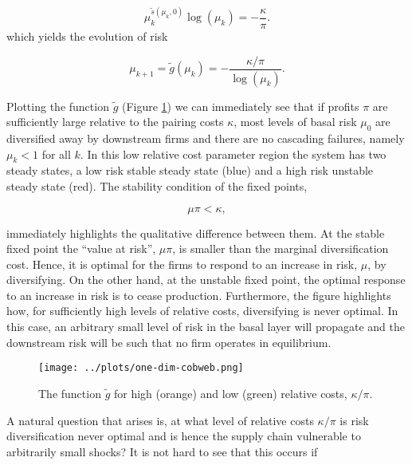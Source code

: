 \documentclass[../../main.tex]{subfiles}
\begin{document}
\begin{equation} \label{eq:one-dimension:foc}
  \mu_k^{\tilde{s}(\mu_k, 0)} \log(\mu_k) = -\frac{\kappa}{\pi}.
\end{equation} which yields the evolution of risk

\begin{equation}
  \mu_{k+1} = \tilde{g}(\mu_k) = -\frac{\kappa / \pi}{\log(\mu_k)}.
\end{equation}

Plotting the function $\tilde{g}$ (Figure \ref{fig:one-dimensional:cobweb}) we can immediately see that if profits $\pi$ are sufficiently large relative to the pairing costs $\kappa$, most levels of basal risk $\mu_0$ are diversified away by downstream firms and there are no cascading failures, namely $\mu_k < 1$ for all $k$. In this low relative cost parameter region the system has two steady states, a low risk stable steady state (blue) and a high risk unstable steady state (red). The stability condition of the fixed points,

\begin{equation}
  \mu \pi < \kappa,
\end{equation}

immediately highlights the qualitative difference between them. At the stable fixed point the ``value at risk'', $\mu \pi$, is smaller than the marginal diversification cost. Hence, it is optimal for the firms to respond to an increase in risk, $\mu$, by diversifying. On the other hand, at the unstable fixed point, the optimal response to an increase in risk is to cease production. Furthermore, the figure highlights how, for sufficiently high levels of relative costs, diversifying is never optimal. In this case, an arbitrary small level of risk in the basal layer will propagate and the downstream risk will be such that no firm operates in equilibrium.

\begin{figure}[H]
  \centering
  \texttt{[image: ../plots/one-dim-cobweb.png]}
  \caption{The function $\tilde{g}$ for high (orange) and low (green) relative costs, $\kappa / \pi$.}
  \label{fig:one-dimensional:cobweb}
\end{figure}


A natural question that arises is, at what level of relative costs $\kappa / \pi$ is risk diversification never optimal and is hence the supply chain vulnerable to arbitrarily small shocks? It is not hard to see that this occurs if 
\end{document}
